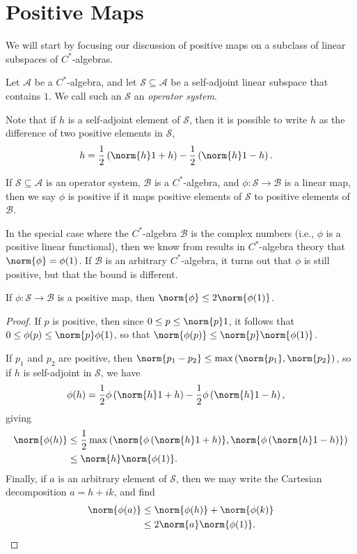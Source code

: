 \documentclass[10pt]{mypackage}
\begin{document}
\RaggedRight
\section{Positive Maps}%
We will start by focusing our discussion of positive maps on a subclass of linear subspaces of $C^{\ast}$-algebras.
\begin{definition}
  Let $\mathcal{A}$ be a $C^{\ast}$-algebra, and let $\mathcal{S}\subseteq \mathcal{A}$ be a self-adjoint linear subspace that contains $1$. We call such an $\mathcal{S}$ an \textit{operator system}.
\end{definition}
Note that if $h$ is a self-adjoint element of $\mathcal{S}$, then it is possible to write $h$ as the difference of two positive elements in $\mathcal{S}$,
\begin{align*}
  h &= \frac{1}{2}\left( \norm{h}1 + h \right) - \frac{1}{2}\left( \norm{h}1-h \right).
\end{align*}
\begin{definition}
  If $\mathcal{S}\subseteq \mathcal{A}$ is an operator system, $\mathcal{B}$ is a $C^{\ast}$-algebra, and $\phi\colon \mathcal{S}\rightarrow \mathcal{B}$ is a linear map, then we say $\phi$ is positive if it maps positive elements of $\mathcal{S}$ to positive elements of $\mathcal{B}$.
\end{definition}
In the special case where the $C^{\ast}$-algebra $\mathcal{B}$ is the complex numbers (i.e., $\phi$ is a positive linear functional), then we know from results in $C^{\ast}$-algebra theory that $\norm{\phi} = \phi(1)$. If $\mathcal{B}$ is an arbitrary $C^{\ast}$-algebra, it turns out that $\phi$ is still positive, but that the bound is different.
\begin{proposition}
  If $\phi\colon \mathcal{S}\rightarrow \mathcal{B}$ is a positive map, then $\norm{\phi}\leq 2\norm{\phi(1)}$.
\end{proposition}
\begin{proof}
  If $p$ is positive, then since $0\leq p \leq \norm{p}1$, it follows that $0\leq \phi(p)\leq \norm{p}\phi(1)$, so that $\norm{\phi(p)}\leq \norm{p}\norm{\phi(1)}$.

  If $p_1$ and $p_2$ are positive, then $\norm{p_1-p_2}\leq \max\left( \norm{p_1},\norm{p_2} \right)$, so if $h$ is self-adjoint in $\mathcal{S}$, we have
  \begin{align*}
    \phi(h) &= \frac{1}{2}\phi\left( \norm{h}1 + h \right) - \frac{1}{2}\phi\left( \norm{h}1 - h \right),
  \end{align*}
  giving
  \begin{align*}
    \norm{\phi(h)} &\leq \frac{1}{2}\max\left( \norm{\phi\left( \norm{h}1 + h \right)}, \norm{\phi\left( \norm{h}1 - h \right)}\right)\\
                   &\leq \norm{h}\norm{\phi(1)}.
  \end{align*}
  Finally, if $a$ is an arbitrary element of $\mathcal{S}$, then we may write the Cartesian decomposition $a = h + ik$, and find
  \begin{align*}
    \norm{\phi(a)} &\leq \norm{\phi(h)} + \norm{\phi(k)}\\
                   &\leq 2\norm{a}\norm{\phi(1)}.
  \end{align*}
\end{proof}
\end{document}
